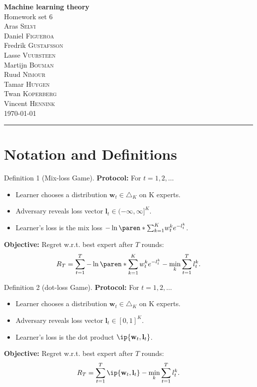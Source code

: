 \documentclass[10pt, a4paper, twoside]{amsart}
\theoremstyle{plain}
\DeclarePairedDelimiter\paren()
\DeclarePairedDelimiter{\ip}\langle\rangle
\begin{document}
\begin{center}
    {\huge\bf Machine learning theory}\\
    {\large\sc Homework set 6 }\\ \vspace{1em}
    {Aras} \textsc{ {Selvi}} \\
    {Daniel} \textsc{ {Figueroa}}\\
    {Fredrik} \textsc{ {Gustafsson}}\\
    {Lasse} \textsc{ {Vuursteen}}\\
    {Martijn} \textsc{ {Bouman}}\\
    {Ruud} \textsc{ {Nimour}}\\
    {Tamar} \textsc{ {Huygen}}\\
    {Twan} \textsc{ {Koperberg}}\\
    {Vincent} \textsc{ {Hennink}}\\ 
    \bigskip
    \today \bigskip
    \hrule
    \bigskip
\end{center}

\section{Notation and Definitions}
\begin{definitionbox}{Definition 1 (Mix-loss Game).}
\textbf{Protocol:} For $t = 1,2, \ldots$
\begin{itemize}
    \item Learner chooses a distribution $\mathbf{w}_t \in \triangle_K$ on K experts.
    \item Adversary reveals loss vector $\mathbf{l}_t \in (-\infty , \infty]^K$.
    \item Learner's loss is the mix loss $-\ln \paren*{\sum_{k=1}^K} w_t^k e^{-l_t^k}$.
\end{itemize}
\textbf{Objective:} Regret w.r.t. best expert after $T$ rounds:
\begin{equation*}
    R_T = \sum^T_{t=1} - \ln \paren*{\sum_{k=1}^K w_t^k e^{-l_t^k}} - \min_k \sum_{t=1}^T l_t^k .
\end{equation*}
\end{definitionbox}
\begin{definitionbox}{Definition 2 (dot-loss Game).}
\textbf{Protocol:} For $t = 1,2, \ldots$
\begin{itemize}
    \item Learner chooses a distribution $\mathbf{w}_t \in \triangle_K$ on K experts.
    \item Adversary reveals loss vector $\mathbf{l}_t \in [0,1]^K$.
    \item Learner's loss is the dot product $\ip{\mathbf{w}_t , \mathbf{l}_t}$.
\end{itemize}
\textbf{Objective:} Regret w.r.t. best expert after $T$ rounds:
\begin{equation*}
    R_T = \sum^T_{t=1} \ip{\mathbf{w}_t , \mathbf{l}_t} - \min_k \sum_{t=1}^T l_t^k .
\end{equation*}
\end{definitionbox}
\end{document}
